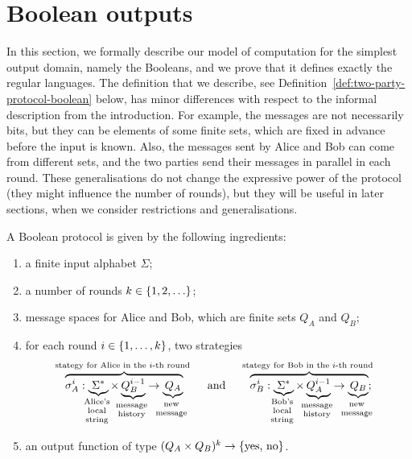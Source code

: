 
\section{Boolean outputs}
\label{sec:boolean-domain}
In this section, we formally describe our model of computation for the simplest output domain, namely the Booleans, and we prove that it defines exactly the regular languages.  The definition that we describe, see Definition~\ref{def:two-party-protocol-boolean} below, has minor differences with respect to the informal description from the introduction. For example, the messages are not necessarily bits, but they can be elements of some finite sets, which are fixed in advance before the input is known. Also, the messages sent by Alice and Bob can come from different sets, and the two parties send their messages in parallel in each round. 
 These generalisations do not change the expressive power of the protocol (they might influence the number of rounds), but they will be useful in later sections, when we consider restrictions and generalisations. 

\begin{definition}
    \label{def:two-party-protocol-boolean}
  A Boolean protocol 
   is given by the following ingredients: 
  \begin{enumerate}
    \item a finite input alphabet $\Sigma$;
    \item a number of rounds $k \in \{1,2,\ldots\}$;
    \item message spaces for Alice and Bob, which are finite sets $Q_A$ and $Q_B$;
    \item for each round $i \in \{1,\ldots,k\}$, two strategies
    \begin{align*}
    \myoverbrace{\sigma_A^i : \myunderbrace{\Sigma^*}{Alice's \\ local\\ string} \times \myunderbrace{Q_B^{i-1}}{message \\ history}  \to \myunderbrace{Q_A}{new\\ message}}{stategy for Alice in the $i$-th round}
    \qquad \text{and} \qquad 
        \myoverbrace{\sigma_B^i : \myunderbrace{\Sigma^*}{Bob's \\ local\\ string} \times \myunderbrace{Q_A^{i-1}}{message \\ history}  \to \myunderbrace{Q_B}{new\\ message}}{stategy for Bob in the $i$-th round};
    \end{align*}
    \item an output function of type $(Q_A \times Q_B)^{k} \to \{\text{yes, no}\}$.
  \end{enumerate}
\end{definition}

